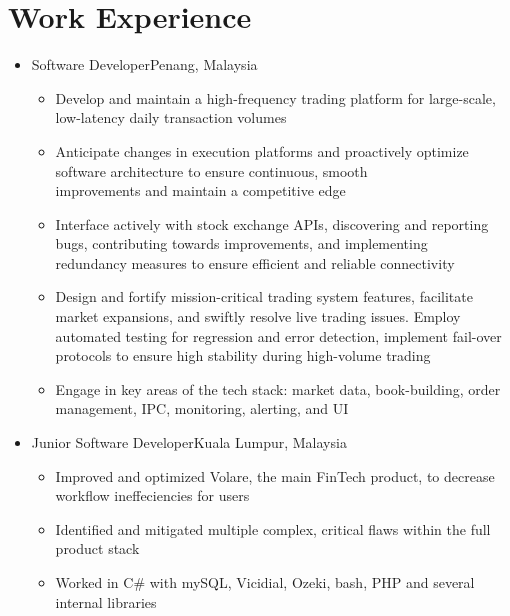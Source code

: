 \documentclass[10pt,letterpaper,sans]{moderncv}
\renewcommand{\_}{\textscale{.7}{\textunderscore}}
\begin{document}
\section{Work Experience}
\vspace{0.75em}
\begin{itemize}
  \item{
  {Software Developer}{Penang, Malaysia}{}{
    \begin{itemize}
      \item Develop and maintain a high-frequency trading platform for large-scale, low-latency daily transaction volumes
      \item Anticipate changes in execution platforms and proactively optimize software architecture to ensure continuous, smooth \\improvements and maintain a competitive edge
      \item Interface actively with stock exchange APIs, discovering and reporting bugs, contributing towards improvements, and implementing \\redundancy measures to ensure efficient and reliable connectivity
      \item Design and fortify mission-critical trading system features, facilitate market expansions, and swiftly resolve live trading issues. Employ automated testing for regression and error detection, implement fail-over protocols to ensure high stability during high-volume trading
      \item Engage in key areas of the tech stack: market data, book-building, order management, IPC, monitoring, alerting, and UI
    \end{itemize}
}}
\vspace{0.75em}
\item{
  {Junior Software Developer}{Kuala Lumpur, Malaysia}{}{
    \begin{itemize}
    \item Improved and optimized Volare, the main FinTech product, to decrease workflow ineffeciencies for users
    \item Identified and mitigated multiple complex, critical flaws within the full product stack
    \item Worked in C\# with mySQL, Vicidial, Ozeki, bash, PHP and several internal libraries
    \end{itemize}
}}
\end{itemize}
\end{document}
